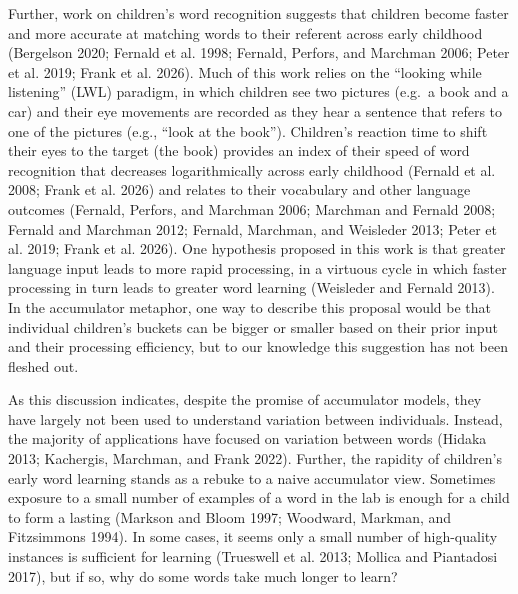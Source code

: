 \documentclass[
  11pt,
]{article}
\begin{document}
Further, work on children's word recognition suggests that children
become faster and more accurate at matching words to their referent
across early childhood (Bergelson 2020; Fernald et al. 1998; Fernald,
Perfors, and Marchman 2006; Peter et al. 2019; Frank et al. 2026). Much
of this work relies on the ``looking while listening'' (LWL) paradigm,
in which children see two pictures (e.g.~a book and a car) and their eye
movements are recorded as they hear a sentence that refers to one of the
pictures (e.g., ``look at the book''). Children's reaction time to shift
their eyes to the target (the book) provides an index of their speed of
word recognition that decreases logarithmically across early childhood
(Fernald et al. 2008; Frank et al. 2026) and relates to their vocabulary
and other language outcomes (Fernald, Perfors, and Marchman 2006;
Marchman and Fernald 2008; Fernald and Marchman 2012; Fernald, Marchman,
and Weisleder 2013; Peter et al. 2019; Frank et al. 2026). One
hypothesis proposed in this work is that greater language input leads to
more rapid processing, in a virtuous cycle in which faster processing in
turn leads to greater word learning (Weisleder and Fernald 2013). In the
accumulator metaphor, one way to describe this proposal would be that
individual children's buckets can be bigger or smaller based on their
prior input and their processing efficiency, but to our knowledge this
suggestion has not been fleshed out.

As this discussion indicates, despite the promise of accumulator models,
they have largely not been used to understand variation between
individuals. Instead, the majority of applications have focused on
variation between words (Hidaka 2013; Kachergis, Marchman, and Frank
2022). Further, the rapidity of children's early word learning stands as
a rebuke to a naive accumulator view. Sometimes exposure to a small
number of examples of a word in the lab is enough for a child to form a
lasting (Markson and Bloom 1997; Woodward, Markman, and Fitzsimmons
1994). In some cases, it seems only a small number of high-quality
instances is sufficient for learning (Trueswell et al. 2013; Mollica and
Piantadosi 2017), but if so, why do some words take much longer to
learn?
\end{document}
